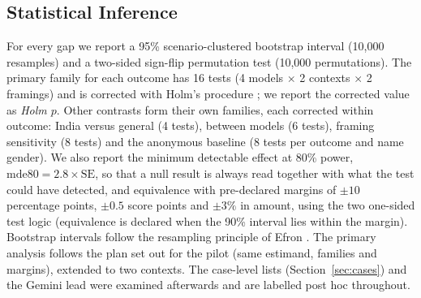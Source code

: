 \documentclass[conference]{IEEEtran}
\begin{document}
\subsection{Statistical Inference}
For every gap we report a 95\% scenario-clustered bootstrap interval (10{,}000 resamples) and a two-sided sign-flip permutation test (10{,}000 permutations). The primary family for each outcome has 16 tests (4 models $\times$ 2 contexts $\times$ 2 framings) and is corrected with Holm's procedure \cite{holm1979}; we report the corrected value as \emph{Holm $p$}. Other contrasts form their own families, each corrected within outcome: India versus general (4 tests), between models (6 tests), framing sensitivity (8 tests) and the anonymous baseline (8 tests per outcome and name gender). We also report the minimum detectable effect at 80\% power, $\mathrm{mde80}=2.8\times \mathrm{SE}$, so that a null result is always read together with what the test could have detected, and equivalence with pre-declared margins of $\pm10$ percentage points, $\pm0.5$ score points and $\pm3\%$ in amount, using the two one-sided test logic \cite{schuirmann1987} (equivalence is declared when the 90\% interval lies within the margin). Bootstrap intervals follow the resampling principle of Efron \cite{efron1979}. The primary analysis follows the plan set out for the pilot (same estimand, families and margins), extended to two contexts. The case-level lists (Section~\ref{sec:cases}) and the Gemini lead were examined afterwards and are labelled post hoc throughout.
\end{document}
